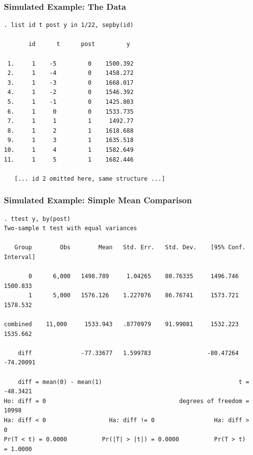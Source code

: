 \documentclass[11pt,aspectratio=169]{beamer}
\begin{document}
\begin{frame}[fragile]
  \frametitle{Simulated Example: The Data}
{\scriptsize
\begin{verbatim}
. list id t post y in 1/22, sepby(id)

       id      t      post         y

 1.     1    -5         0    1500.392
 2.     1    -4         0    1458.272
 3.     1    -3         0    1668.017
 4.     1    -2         0    1546.392
 5.     1    -1         0    1425.803
 6.     1     0         0    1533.735
 7.     1     1         1     1492.77
 8.     1     2         1    1618.688
 9.     1     3         1    1635.518
10.     1     4         1    1582.649
11.     1     5         1    1682.446

   [... id 2 omitted here, same structure ...]
\end{verbatim}
}
\end{frame}

\begin{frame}[fragile]
  \frametitle{Simulated Example: Simple Mean Comparison}
{\scriptsize
\begin{verbatim}
. ttest y, by(post)
Two-sample t test with equal variances

   Group        Obs        Mean   Std. Err.   Std. Dev.    [95% Conf. Interval]

       0      6,000   1498.789     1.04265    80.76335     1496.746   1500.833
       1      5,000   1576.126    1.227076    86.76741     1573.721   1578.532

combined    11,000     1533.943   .8770979    91.99081     1532.223   1535.662

    diff              -77.33677   1.599783                -80.47264   -74.20091

    diff = mean(0) - mean(1)                                       t = -48.3421
Ho: diff = 0                                      degrees of freedom =    10998
Ha: diff < 0                  Ha: diff != 0                 Ha: diff > 0
Pr(T < t) = 0.0000          Pr(|T| > |t|) = 0.0000          Pr(T > t) = 1.0000
\end{verbatim}
}
\end{frame}
\end{document}
